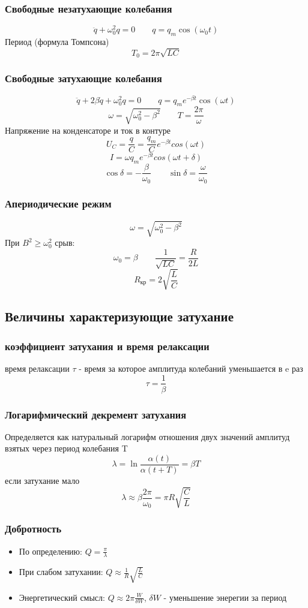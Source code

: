 \documentclass{article}
\begin{document}
\subsubsection{Свободные незатухающие колебания}
\[\ddot{q} + \omega_0^2q = 0 \qquad q= q_m\cos(\omega_0t)\]
Период (формула Томпсона)
\[T_0 = 2\pi\sqrt{LC}\]
\subsubsection{Свободные затухающие колебания}
\[\ddot{q} + 2\beta\dot{q} + \omega_0^2q = 0 \qquad q= q_m e^{-\beta t} \cos(\omega t)\]
\[\omega = \sqrt{\omega_0^2 - \beta^2} \qquad T = \frac{2\pi}{\omega}\]
Напряжение на конденсаторе и ток в контуре
\[U_C = \frac{q}{C} = \frac{q_m}{C}e^{-\beta t}cos(\omega t)\]
\[I = \omega q_m e ^ {-\beta t} cos(\omega t + \delta)\]
\[\cos\delta=-\frac{\beta}{\omega_0} \qquad \sin\delta=\frac{\omega}{\omega_0}\]
\subsubsection{Апериодические режим}
\[\omega=\sqrt{\omega_0^2-\beta^2}\]
При $B^2\ge\omega_0^2$ срыв:
\[\omega_0=\beta \qquad \frac{1}{\sqrt{LC}}=\frac{R}{2L}\]
\[R_{\text{кр}}=2\sqrt{\frac{L}{C}}\]
\subsection{Величины характеризующие затухание}
\subsubsection{коэффициент затухания и время релаксации}
время релаксации  $\tau$ - время за которое амплитуда колебаний уменьшается в e раз
\[\tau = \frac{1}{\beta}\]
\subsubsection{Логарифмический декремент затухания}
Определяется как натуральный логарифм отношения двух значений амплитуд взятых через период колебания T
\[\lambda = \ln{\frac{\alpha(t)}{\alpha(t + T)}} = \beta T\]
если затухание мало 
\[\lambda \approx \beta \frac{2\pi}{\omega_0} = \pi R \sqrt{\frac{C}{L}}\]
\subsubsection{Добротность}
\begin{itemize}
    \item По определению: $Q = \frac{\pi}{\lambda}$
    \item При слабом затухании: $Q \approx \frac{1}{R}\sqrt{\frac{L}{C}}$
    \item Энергетический смысл: $Q \approx 2\pi \frac{W}{\delta W}$, $\delta W$ - уменьшение энерегии за период
\end{itemize}
\end{document}

